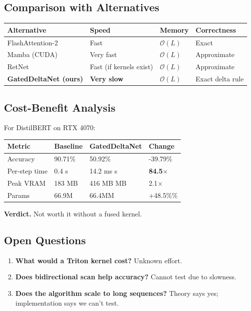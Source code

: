 \subsection{Comparison with Alternatives}

\begin{table}[H]
\centering
\small
\begin{tabular}{llll}
\toprule
\textbf{Alternative} & \textbf{Speed} & \textbf{Memory} & \textbf{Correctness} \\
\midrule
FlashAttention-2 & Fast & $\mathcal{O}(L)$ & Exact \\
Mamba (CUDA) & Very fast & $\mathcal{O}(L)$ & Approximate \\
RetNet & Fast (if kernels exist) & $\mathcal{O}(L)$ & Approximate \\
\textbf{GatedDeltaNet (ours)} & \textbf{Very slow} & $\mathcal{O}(L)$ & Exact delta rule \\
\bottomrule
\end{tabular}
\end{table}

\subsection{Cost-Benefit Analysis}

For DistilBERT on RTX 4070:

\begin{table}[H]
\centering
\small
\begin{tabular}{llll}
\toprule
\textbf{Metric} & \textbf{Baseline} & \textbf{GatedDeltaNet} & \textbf{Change} \\
\midrule
Accuracy & 90.71\% & 50.92\% & -39.79\% \\
Per-step time & 0.4 s & 14.2 ms s & \textbf{84.5$\times$} \\
Peak VRAM & 183 MB & 416 MB MB & 2.1$\times$ \\
Params & 66.9M & 66.4MM & +48.5\%\% \\
\bottomrule
\end{tabular}
\end{table}

\textbf{Verdict.} Not worth it without a fused kernel.

\subsection{Open Questions}

\begin{enumerate}
\item \textbf{What would a Triton kernel cost?} Unknown effort.
\item \textbf{Does bidirectional scan help accuracy?} Cannot test due to slowness.
\item \textbf{Does the algorithm scale to long sequences?} Theory says yes;
  implementation says we can't test.

\end{enumerate}
